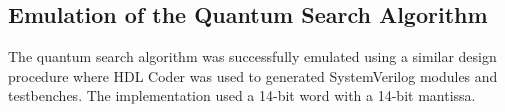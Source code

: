 \subsection{Emulation of the Quantum Search Algorithm}

The quantum search algorithm was successfully emulated using a similar design procedure where HDL Coder was used to generated SystemVerilog modules and testbenches. The implementation used a 14-bit word with a 14-bit mantissa.  


